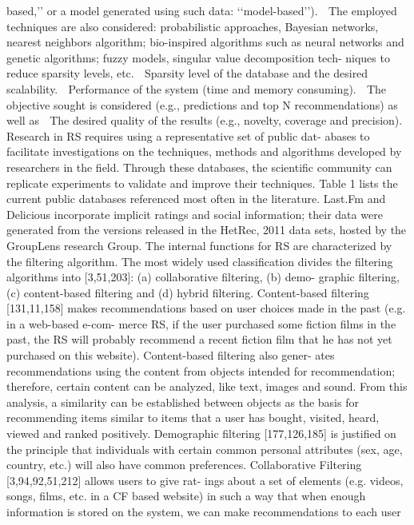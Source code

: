 \documentclass[11pt]{article}
\begin{document}
based,’’ or a model generated using such data: ‘‘model-based’’).
 The employed techniques are also considered: probabilistic
approaches, Bayesian networks, nearest neighbors algorithm;
bio-inspired algorithms such as neural networks and genetic
algorithms; fuzzy models, singular value decomposition tech-
niques to reduce sparsity levels, etc.
 Sparsity level of the database and the desired scalability.
 Performance of the system (time and memory consuming).
 The objective sought is considered (e.g., predictions and top N
recommendations) as well as
 The desired quality of the results (e.g., novelty, coverage and
precision).
Research in RS requires using a representative set of public dat-
abases to facilitate investigations on the techniques, methods and
algorithms developed by researchers in the field. Through these
databases, the scientific community can replicate experiments to
validate and improve their techniques. Table 1 lists the current
public databases referenced most often in the literature. Last.Fm
and Delicious incorporate implicit ratings and social information;
their data were generated from the versions released in the HetRec,
2011 data sets, hosted by the GroupLens research Group.
The internal functions for RS are characterized by the filtering
algorithm. The most widely used classification divides the filtering
algorithms into [3,51,203]: (a) collaborative filtering, (b) demo-
graphic filtering, (c) content-based filtering and (d) hybrid filtering. Content-based filtering [131,11,158] makes recommendations
based on user choices made in the past (e.g. in a web-based e-com-
merce RS, if the user purchased some fiction films in the past, the
RS will probably recommend a recent fiction film that he has not
yet purchased on this website). Content-based filtering also gener-
ates recommendations using the content from objects intended for
recommendation; therefore, certain content can be analyzed, like
text, images and sound. From this analysis, a similarity can be
established between objects as the basis for recommending items
similar to items that a user has bought, visited, heard, viewed
and ranked positively.
Demographic filtering [177,126,185] is justified on the principle
that individuals with certain common personal attributes (sex,
age, country, etc.) will also have common preferences.
Collaborative Filtering [3,94,92,51,212] allows users to give rat-
ings about a set of elements (e.g. videos, songs, films, etc. in a CF
based website) in such a way that when enough information is
stored on the system, we can make recommendations to each user
\end{document}
